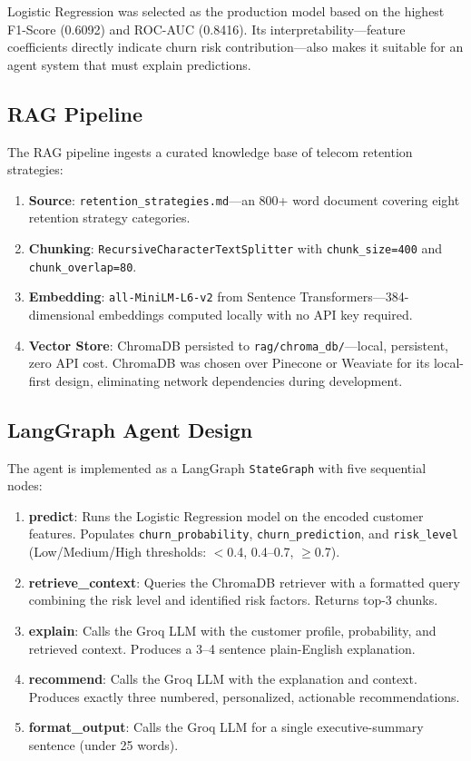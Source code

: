 Logistic Regression was selected as the production model based on the highest F1-Score
(0.6092) and ROC-AUC (0.8416). Its interpretability---feature coefficients directly
indicate churn risk contribution---also makes it suitable for an agent system that must
explain predictions.

\subsection{RAG Pipeline}
\label{sec:rag}

The RAG pipeline ingests a curated knowledge base of telecom retention strategies:

\begin{enumerate}[leftmargin=*]
    \item \textbf{Source}: \texttt{retention\_strategies.md}---an 800+ word document covering
        eight retention strategy categories.
    \item \textbf{Chunking}: \texttt{RecursiveCharacterTextSplitter} with
        \texttt{chunk\_size=400} and \texttt{chunk\_overlap=80}.
    \item \textbf{Embedding}: \texttt{all-MiniLM-L6-v2} from Sentence Transformers---384-dimensional
        embeddings computed locally with no API key required.
    \item \textbf{Vector Store}: ChromaDB persisted to \texttt{rag/chroma\_db/}---local,
        persistent, zero API cost. ChromaDB was chosen over Pinecone or Weaviate for its
        local-first design, eliminating network dependencies during development.
\end{enumerate}

\subsection{LangGraph Agent Design}
\label{sec:agent}

The agent is implemented as a LangGraph \texttt{StateGraph} with five sequential nodes:

\begin{enumerate}[leftmargin=*]
    \item \textbf{predict}: Runs the Logistic Regression model on the encoded customer features.
        Populates \texttt{churn\_probability}, \texttt{churn\_prediction}, and \texttt{risk\_level}
        (Low/Medium/High thresholds: $<$0.4, 0.4--0.7, $\geq$0.7).
    \item \textbf{retrieve\_context}: Queries the ChromaDB retriever with a formatted query
        combining the risk level and identified risk factors. Returns top-3 chunks.
    \item \textbf{explain}: Calls the Groq LLM with the customer profile, probability, and
        retrieved context. Produces a 3--4 sentence plain-English explanation.
    \item \textbf{recommend}: Calls the Groq LLM with the explanation and context. Produces
        exactly three numbered, personalized, actionable recommendations.
    \item \textbf{format\_output}: Calls the Groq LLM for a single executive-summary sentence
        (under 25 words).
\end{enumerate}

